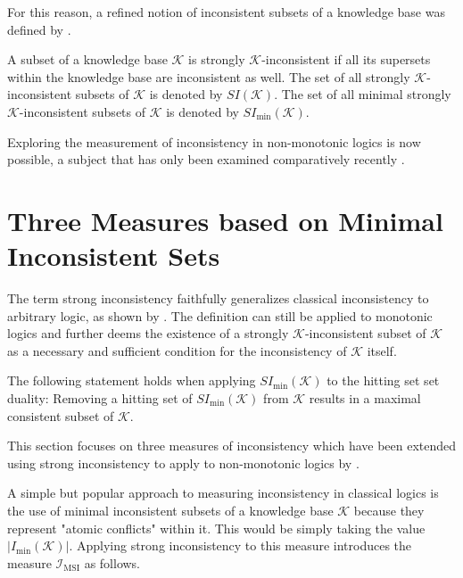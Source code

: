 For this reason, a refined notion of inconsistent subsets of a knowledge base was defined by \cite{brewka_strong_2017}.
\begin{definition}
    A subset of a knowledge base \(\mathcal{K}\) is strongly \(\mathcal{K}\)-inconsistent if all its supersets within the knowledge base are inconsistent as well. The set of all strongly \(\mathcal{K}\)-inconsistent subsets of \(\mathcal{K}\) is denoted by \(SI(\mathcal{K})\). The set of all minimal strongly \(\mathcal{K}\)-inconsistent subsets of \(\mathcal{K}\) is denoted by \(SI_{\min}(\mathcal{K})\).
\end{definition}

Exploring the measurement of inconsistency in non-monotonic logics is now possible, a subject that has only been examined comparatively recently \cite{ulbricht_measuring_2018} \cite{brewka_strong_2019} \cite{ulbricht_handling_2020}.

\section{Three Measures based on Minimal Inconsistent Sets}
The term strong inconsistency faithfully generalizes classical inconsistency to arbitrary logic, as shown by \cite{brewka_strong_2017}. The definition can still be applied to monotonic logics and further deems the existence of a strongly \(\mathcal{K}\)-inconsistent subset of \(\mathcal{K}\) as a necessary and sufficient condition for the inconsistency of \(\mathcal{K}\) itself.

\begin{theorem}
    The following statement holds when applying \(SI_{\min}(\mathcal{K})\) to the hitting set set duality:
    Removing a hitting set of \(SI_{\min}(\mathcal{K})\) from \(\mathcal{K}\) results in a maximal consistent subset of \(\mathcal{K}\).
\end{theorem}

This section focuses on three measures of inconsistency which have been extended using strong inconsistency to apply to non-monotonic logics by \cite{ulbricht_handling_2020}.

A simple but popular approach to measuring inconsistency in classical logics is the use of minimal inconsistent subsets of a knowledge base \(\mathcal{K}\) because they represent "atomic conflicts" within it. This would be simply taking the value \(\left| I_{\min}(\mathcal{K}) \right|\). Applying strong inconsistency to this measure introduces the measure \(\mathcal{I}_{\text{MSI}}\) as follows.

